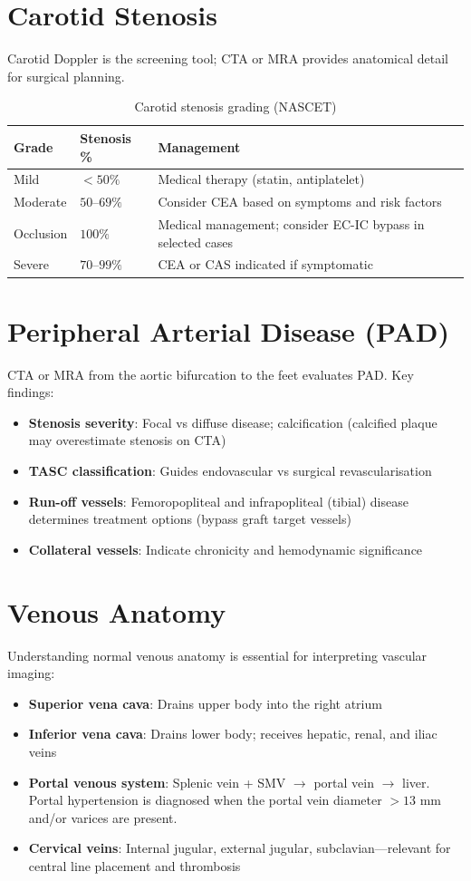 \section{Carotid Stenosis}
Carotid Doppler is the screening tool; CTA or MRA provides anatomical detail for surgical planning.

\begin{table}[h]
\centering
\caption{Carotid stenosis grading (NASCET)}
\begin{tabular}{p{3cm} p{4cm} p{4cm}}
\hline
\textbf{Grade} & \textbf{Stenosis \%} & \textbf{Management} \\
\hline
Mild & $< 50\%$ & Medical therapy (statin, antiplatelet) \\
Moderate & $50$--$69\%$ & Consider CEA based on symptoms and risk factors \\
Occlusion & $100\%$ & Medical management; consider EC-IC bypass in selected cases \\
Severe & $70$--$99\%$ & CEA or CAS indicated if symptomatic \\
\hline
\end{tabular}
\end{table}


\section{Peripheral Arterial Disease (PAD)}
CTA or MRA from the aortic bifurcation to the feet evaluates PAD. Key findings:
\begin{itemize}
  \item \textbf{Stenosis severity}: Focal vs diffuse disease; calcification (calcified plaque may overestimate stenosis on CTA)
  \item \textbf{TASC classification}: Guides endovascular vs surgical revascularisation
  \item \textbf{Run-off vessels}: Femoropopliteal and infrapopliteal (tibial) disease determines treatment options (bypass graft target vessels)
  \item \textbf{Collateral vessels}: Indicate chronicity and hemodynamic significance
\end{itemize}


\section{Venous Anatomy}
Understanding normal venous anatomy is essential for interpreting vascular imaging:
\begin{itemize}
  \item \textbf{Superior vena cava}: Drains upper body into the right atrium
  \item \textbf{Inferior vena cava}: Drains lower body; receives hepatic, renal, and iliac veins
  \item \textbf{Portal venous system}: Splenic vein + SMV $\rightarrow$ portal vein $\rightarrow$ liver. Portal hypertension is diagnosed when the portal vein diameter $> 13$ mm and/or varices are present.
  \item \textbf{Cervical veins}: Internal jugular, external jugular, subclavian---relevant for central line placement and thrombosis
\end{itemize}


